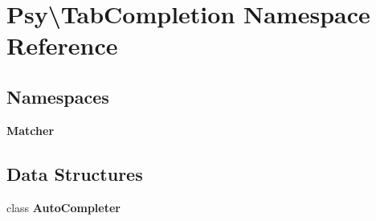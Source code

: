 \section{Psy\textbackslash{}Tab\+Completion Namespace Reference}
\label{namespace_psy_1_1_tab_completion}
\subsection*{Namespaces}
\begin{DoxyCompactItemize}
\item 
 {\bf Matcher}
\end{DoxyCompactItemize}
\subsection*{Data Structures}
\begin{DoxyCompactItemize}
\item 
class {\bf Auto\+Completer}
\end{DoxyCompactItemize}
